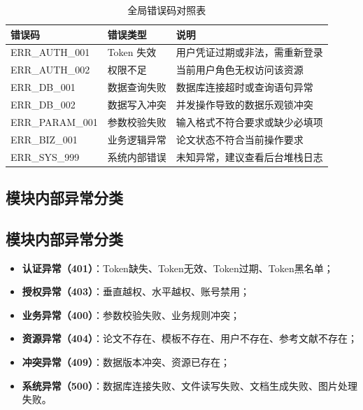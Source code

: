 \documentclass{../template/softeng}
\begin{document}
\begin{table}[htbp]
    \centering
    \caption{全局错误码对照表}
    \begin{tabular}{|p{3cm}|p{4cm}|p{6cm}|}
        \hline
        \textbf{错误码} & \textbf{错误类型} & \textbf{说明} \\
        \hline
        ERR\_AUTH\_001 & Token 失效 & 用户凭证过期或非法，需重新登录 \\
        \hline
        ERR\_AUTH\_002 & 权限不足 & 当前用户角色无权访问该资源 \\
        \hline
        ERR\_DB\_001 & 数据查询失败 & 数据库连接超时或查询语句异常 \\
        \hline
        ERR\_DB\_002 & 数据写入冲突 & 并发操作导致的数据乐观锁冲突 \\
        \hline
        ERR\_PARAM\_001 & 参数校验失败 & 输入格式不符合要求或缺少必填项 \\
        \hline
        ERR\_BIZ\_001 & 业务逻辑异常 & 论文状态不符合当前操作要求 \\
        \hline
        ERR\_SYS\_999 & 系统内部错误 & 未知异常，建议查看后台堆栈日志 \\
        \hline
    \end{tabular}
    \label{tab:error_code}
\end{table}

\subsection{模块内部异常分类}

	\subsection{模块内部异常分类}
	\begin{itemize}
		\item \textbf{认证异常（401）}：Token缺失、Token无效、Token过期、Token黑名单；
		\item \textbf{授权异常（403）}：垂直越权、水平越权、账号禁用；
		\item \textbf{业务异常（400）}：参数校验失败、业务规则冲突；
		\item \textbf{资源异常（404）}：论文不存在、模板不存在、用户不存在、参考文献不存在；
		\item \textbf{冲突异常（409）}：数据版本冲突、资源已存在；
		\item \textbf{系统异常（500）}：数据库连接失败、文件读写失败、文档生成失败、图片处理失败。
	\end{itemize}
\end{document}
